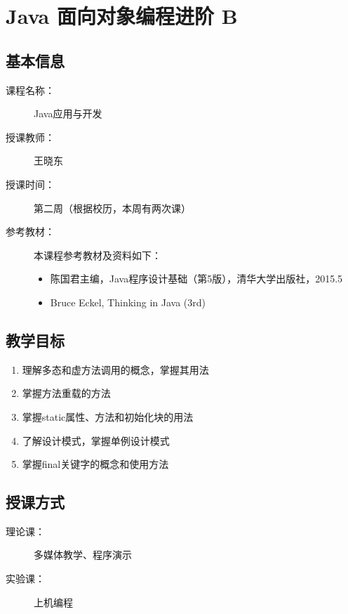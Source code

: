 \chapter{Java 面向对象编程进阶 B}
\label{chp:Advanced-object-oriented-programming-2}

\section*{基本信息}
\sline
\begin{description}
\item[课程名称：] Java应用与开发
\item[授课教师：] 王晓东
\item[授课时间：] 第二周（根据校历，本周有两次课）
\item[参考教材：] 本课程参考教材及资料如下：
  \begin{itemize}
  \item 陈国君主编，Java程序设计基础（第5版），清华大学出版社，2015.5
  \item Bruce Eckel, Thinking in Java (3rd)
  \end{itemize}
\end{description}

\section*{教学目标}

\sline

\begin{enumerate}
\item 理解多态和虚方法调用的概念，掌握其用法
\item 掌握方法重载的方法
\item 掌握static属性、方法和初始化块的用法
\item 了解设计模式，掌握单例设计模式
\item 掌握final关键字的概念和使用方法
\end{enumerate}  

\section*{授课方式}

\sline
\begin{description}
\item[理论课：] 多媒体教学、程序演示
\item[实验课：] 上机编程
\end{description}

\newpage
